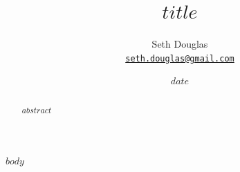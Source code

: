 \documentclass[11pt,a4paper]{article}
\title{$title$}
\author{Seth Douglas\\\href{mailto:seth.douglas@gmail.com}{\texttt{seth.douglas@gmail.com}}}
\date{$date$}
\numberwithin{equation}{section}
\begin{document}
\maketitle
\begin{abstract}
$abstract$
\end{abstract}
$body$


\end{document}
